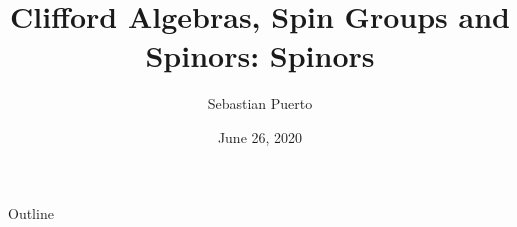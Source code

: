 \documentclass{beamer}
\title[l]{Clifford Algebras, Spin Groups and Spinors: Spinors}
\author{Sebastian Puerto}
\institute{Universidad de los Andes}
\date{June 26, 2020}
\theoremstyle{definition}
\theoremstyle{remark}
\begin{document}
\begin{frame}
  \titlepage
\end{frame}

\begin{frame}{Outline}
  \tableofcontents
\end{frame}








\end{document}
